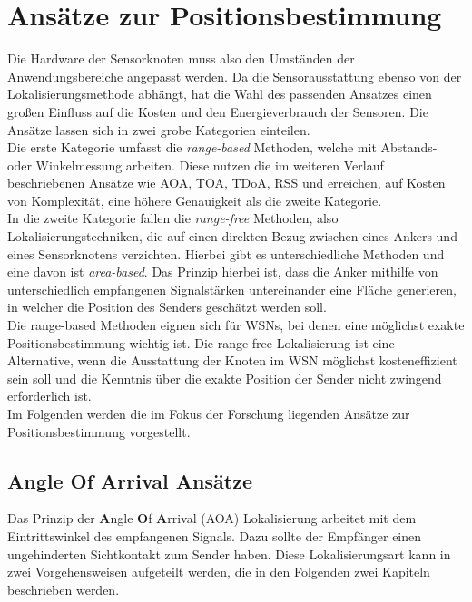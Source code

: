 \documentclass[12pt, a4wide]{scrreprt}
\begin{document}

\chapter{Ansätze zur Positionsbestimmung}
Die Hardware der Sensorknoten muss also den Umständen der Anwendungsbereiche angepasst werden. Da die Sensorausstattung ebenso von der Lokalisierungsmethode abhängt, hat die Wahl des passenden Ansatzes einen großen Einfluss auf die Kosten und den Energieverbrauch der Sensoren. Die Ansätze lassen sich in zwei grobe Kategorien einteilen.\\
\indent
Die erste Kategorie umfasst die \textit{range-based} Methoden, welche mit Abstands- oder Winkelmessung arbeiten. Diese nutzen die im weiteren Verlauf beschriebenen Ansätze wie AOA, TOA, TDoA, RSS und erreichen, auf Kosten von Komplexität, eine höhere Genauigkeit als die zweite Kategorie.\\
\indent
In die zweite Kategorie fallen die \textit{range-free} Methoden, also Lokalisierungstechniken, die auf einen direkten Bezug zwischen eines Ankers und eines Sensorknotens verzichten. Hierbei gibt es unterschiedliche Methoden und eine davon ist \textit{area-based}\cite{area_based}. Das Prinzip hierbei ist, dass die Anker mithilfe von unterschiedlich empfangenen Signalstärken untereinander eine Fläche generieren, in welcher die Position des Senders geschätzt werden soll.\\
\indent
Die range-based Methoden eignen sich für WSNs, bei denen eine möglichst exakte Positionsbestimmung wichtig ist. Die range-free Lokalisierung ist eine Alternative, wenn die Ausstattung der Knoten im WSN möglichst kosteneffizient sein soll und die Kenntnis über die exakte Position der Sender nicht zwingend erforderlich ist.\\ 
\indent
Im Folgenden werden die im Fokus der Forschung liegenden Ansätze zur Positionsbestimmung vorgestellt.
  \section{Angle Of Arrival Ansätze}
Das Prinzip der {\bf A}ngle {\bf O}f {\bf A}rrival (AOA) Lokalisierung arbeitet mit dem Eintrittswinkel des empfangenen Signals. Dazu sollte der Empfänger einen ungehinderten Sichtkontakt zum Sender haben. Diese Lokalisierungsart kann in zwei Vorgehensweisen aufgeteilt werden, die in den Folgenden zwei Kapiteln beschrieben werden.
\newpage    
\end{document}
